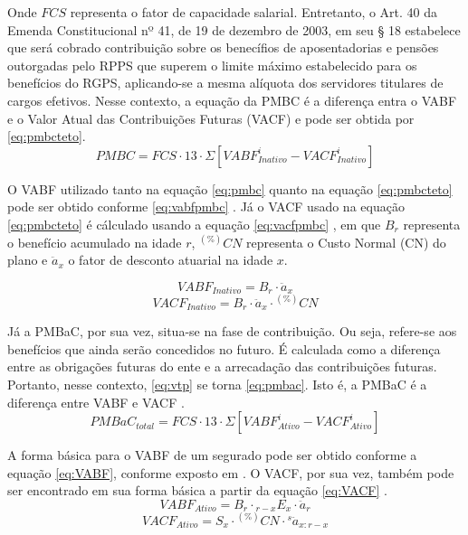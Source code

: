 \noindent Onde $FCS$ representa o fator de capacidade salarial. Entretanto, o Art. 40 da Emenda Constitucional nº 41, de 19 de dezembro de 2003, em seu § 18 estabelece que será cobrado contribuição sobre os benecífios de aposentadorias e pensões outorgadas pelo RPPS que superem o limite máximo estabelecido para os benefícios do RGPS, aplicando-se a mesma alíquota dos servidores titulares de cargos efetivos. Nesse contexto, a equação da PMBC é a diferença entra o VABF e o Valor Atual das Contribuições Futuras (VACF) e pode ser obtida por \ref{eq:pmbcteto}.
\begin{equation} 
    PMBC = FCS \cdot 13 \cdot \Sigma [VABF_{Inativo}^{i} - VACF_{Inativo}^{i}]
    \label{eq:pmbcteto} 
\end{equation}

\noindent O VABF utilizado tanto na equação \ref{eq:pmbc} quanto na equação \ref{eq:pmbcteto} pode ser obtido conforme \ref{eq:vabfpmbc} \cite{winklevoos1993}. Já o VACF usado na equação \ref{eq:pmbcteto} é cálculado usando a equação \ref{eq:vacfpmbc} \cite{rodrigues2012risco}, em que $B_r$ representa o benefício acumulado na idade $r$, ${}^{(\%)}CN$ representa o Custo Normal (CN) do plano e $\ddot{a}_x$ o fator de desconto atuarial na idade $x$.

\begin{equation} 
    VABF_{Inativo} = B_r \cdot \ddot{a}_x
    \label{eq:vabfpmbc} 
\end{equation}
\begin{equation} 
    VACF_{Inativo} = B_r \cdot \ddot{a}_x \cdot {}^{(\%)}CN
    \label{eq:vacfpmbc} 
\end{equation}

Já a PMBaC, por sua vez, situa-se na fase de contribuição. Ou seja, refere-se aos benefícios que ainda serão concedidos no futuro. É calculada como a diferença entre as obrigações futuras do ente e a arrecadação das contribuições futuras. Portanto, nesse contexto, \ref{eq:vtp} se torna \ref{eq:pmbac}. Isto é, a PMBaC é a diferença entre VABF e VACF \cite{rodrigues2012risco}.
\begin{equation} 
    PMBaC_{total} = FCS \cdot 13 \cdot \Sigma [VABF_{Ativo}^{i} - VACF_{Ativo}^{i}]
    \label{eq:pmbac} 
\end{equation}

A forma básica para o VABF de um segurado pode ser obtido conforme a equação \ref{eq:VABF}, conforme exposto em . O VACF, por sua vez, também pode ser encontrado em sua forma básica a partir da equação \ref{eq:VACF} \cite{rodrigues2012risco}.
\begin{equation}
    VABF_{Ativo} = B_r \cdot {}_{r-x}E_x \cdot \ddot{a}_r
    \label{eq:VABF}
\end{equation}
\begin{equation}
    VACF_{Ativo} = S_x \cdot {}^{(\%)}CN\cdot {}^{s}\ddot{a}_{x:r-x}
    \label{eq:VACF}
\end{equation}

